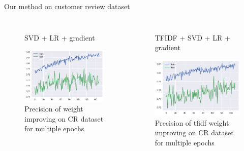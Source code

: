 \documentclass[xcolor={table}]{beamer}
\begin{document}
\begin{frame}{Our method on customer review dataset}
    \begin{columns}
                   \begin{figure}[H]
                    \centering
                    \caption*{SVD + LR + gradient}
                    \includegraphics[height=0.4\textheight]{images/CRDataset_grad.png}
                    \caption{Precision of weight improving on CR dataset for multiple epochs}
                \end{figure}

                \begin{figure}[H]
                    \centering
                    \caption*{TFIDF + SVD + LR + gradient}
                    \includegraphics[height=0.4\textheight]{images/CRDataset_tfidf_grad.png}
                    \caption{Precision of tfidf weight improving on CR dataset for multiple epochs}
                \end{figure}
    \end{columns}                
\end{frame} 
\end{document}
